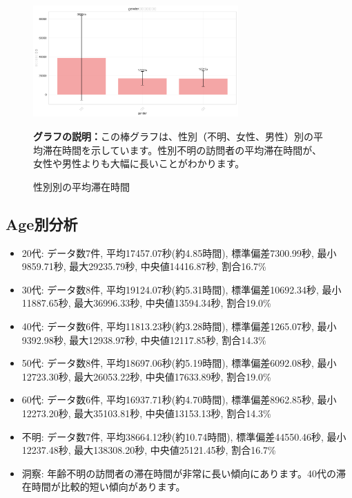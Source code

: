 \documentclass[11pt,a4paper]{article}
\begin{document}
\begin{figure}[H]
    \centering
    \includegraphics[width=0.7\textwidth]{images/gender_bar_chart.png}
    \caption{性別別の平均滞在時間}
    \label{fig:gender}
    \textbf{グラフの説明：}この棒グラフは、性別（不明、女性、男性）別の平均滞在時間を示しています。性別不明の訪問者の平均滞在時間が、女性や男性よりも大幅に長いことがわかります。
\end{figure}

\subsection{Age別分析}

\begin{itemize}
    \item 20代: データ数7件, 平均17457.07秒(約4.85時間), 標準偏差7300.99秒, 最小9859.71秒, 最大29235.79秒, 中央値14416.87秒, 割合16.7\%
    \item 30代: データ数8件, 平均19124.07秒(約5.31時間), 標準偏差10692.34秒, 最小11887.65秒, 最大36996.33秒, 中央値13594.34秒, 割合19.0\%
    \item 40代: データ数6件, 平均11813.23秒(約3.28時間), 標準偏差1265.07秒, 最小9392.98秒, 最大12938.97秒, 中央値12117.85秒, 割合14.3\%
    \item 50代: データ数8件, 平均18697.06秒(約5.19時間), 標準偏差6092.08秒, 最小12723.30秒, 最大26053.22秒, 中央値17633.89秒, 割合19.0\%
    \item 60代: データ数6件, 平均16937.71秒(約4.70時間), 標準偏差8962.85秒, 最小12273.20秒, 最大35103.81秒, 中央値13153.13秒, 割合14.3\%
    \item 不明: データ数7件, 平均38664.12秒(約10.74時間), 標準偏差44550.46秒, 最小12237.48秒, 最大138308.20秒, 中央値25121.45秒, 割合16.7\%
    \item 洞察: 年齢不明の訪問者の滞在時間が非常に長い傾向にあります。40代の滞在時間が比較的短い傾向があります。
\end{itemize}
\end{document}
